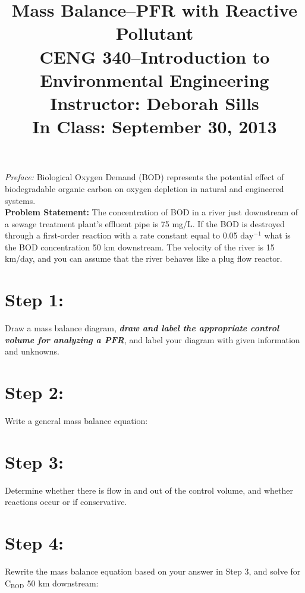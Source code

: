 \documentclass[11pt,letterpaper]{article}
\begin{document}
\setlength{\parindent}{0cm} 



\frenchspacing

\setlength{\textwidth}{6.25in}

\title {\Large{\textbf{Mass Balance--PFR with Reactive Pollutant}}\\ \large{CENG 340--Introduction to Environmental Engineering\\
Instructor: Deborah Sills\\ \textbf{In Class: September 30, 2013}}}

\author {}
\date {}
\maketitle

\vspace{-1.5cm}
\emph{Preface:} Biological Oxygen Demand (BOD) represents the potential effect of biodegradable organic carbon on oxygen depletion in natural and engineered systems.\\

\textbf{Problem Statement:} The concentration of BOD in a river just downstream of a sewage treatment plant's effluent pipe is 75 mg/L.  If the BOD is destroyed through a first-order reaction with a rate constant equal to 0.05 $\mathrm{day^{-1}}$ what is the BOD concentration 50 km downstream.  The velocity of the river is 15 km/day, and you can assume that the river behaves like a plug flow reactor.
\section *{Step 1:} 
Draw a mass balance diagram, \textbf{\emph{draw and label the appropriate control volume for analyzing a PFR}}, and label your diagram with given information and unknowns.

\vspace{0.3in}

\section *{Step 2:}
Write a general mass balance equation:
\vspace{0.2in}

\section *{Step 3:} 
Determine whether there is flow in and out of the control volume, and whether reactions occur or if conservative.
\vspace{0.2in}


\section *{Step 4:}
Rewrite the mass balance equation based on your answer in Step 3, and solve for $\mathrm{C_{BOD}}$ 50 km downstream:
\end{document}
